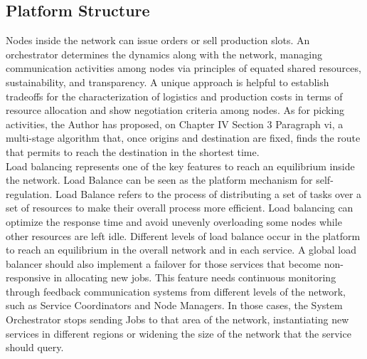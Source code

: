 \subsection{Platform Structure}
Nodes inside the network can issue orders or sell production slots. An orchestrator determines the dynamics along with the network, managing communication activities among nodes via principles of equated shared resources, sustainability, and transparency. A unique approach is helpful to establish tradeoffs for the characterization of logistics and production costs in terms of resource allocation and show negotiation criteria among nodes. As for picking activities, the Author has proposed, on Chapter IV Section 3 Paragraph vi, a multi-stage algorithm that, once origins and destination are fixed, finds the route that permits to reach the destination in the shortest time.\\
Load balancing represents one of the key features to reach an equilibrium inside the network. Load Balance can be seen as the platform mechanism for self-regulation. Load Balance refers to the process of distributing a set of tasks over a set of resources to make their overall process more efficient. Load balancing can optimize the response time and avoid unevenly overloading some nodes while other resources are left idle. Different levels of load balance occur in the platform to reach an equilibrium in the overall network and in each service. A global load balancer should also implement a failover for those services that become non-responsive in allocating new jobs. This feature needs continuous monitoring through feedback communication systems from different levels of the network, such as Service Coordinators and Node Managers. In those cases, the System Orchestrator stops sending Jobs to that area of the network, instantiating new services in different regions or widening the size of the network that the service should query.\\
